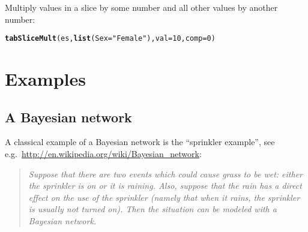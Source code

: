 \documentclass[10pt]{article}\usepackage[]{graphicx}\usepackage[]{xcolor}
\makeatletter
\newcommand{\hlnum}[1]{\textcolor[rgb]{0.686,0.059,0.569}{#1}}%
\newcommand{\hlstr}[1]{\textcolor[rgb]{0.192,0.494,0.8}{#1}}%
\newcommand{\hlstd}[1]{\textcolor[rgb]{0.345,0.345,0.345}{#1}}%
\newcommand{\hlkwc}[1]{\textcolor[rgb]{0.333,0.667,0.333}{#1}}%
\newcommand{\hlkwd}[1]{\textcolor[rgb]{0.737,0.353,0.396}{\textbf{#1}}}%
\newenvironment{kframe}{%
 \def\at@end@of@kframe{}%
 \ifinner\ifhmode%
  \def\at@end@of@kframe{\end{minipage}}%
  \begin{minipage}{\columnwidth}%
 \fi\fi%
 \def\FrameCommand##1{\hskip\@totalleftmargin \hskip-\fboxsep
 \colorbox{shadecolor}{##1}\hskip-\fboxsep
     \hskip-\linewidth \hskip-\@totalleftmargin \hskip\columnwidth}%
 \MakeFramed {\advance\hsize-\width
   \@totalleftmargin\z@ \linewidth\hsize
   \@setminipage}}%
 {\par\unskip\endMakeFramed%
 \at@end@of@kframe}
\newenvironment{knitrout}{}{} %
\def\code#1{\texttt{#1}}
\def\rr#1{\code{#1}[{\scriptsize gRbase}]}
\makeatother
\begin{document}
Multiply values in a slice by some number and all other values by
another number:
\begin{knitrout}\small
{}\color{fgcolor}\begin{kframe}
\begin{alltt}
\hlkwd{tabSliceMult}\hlstd{(es,} \hlkwd{list}\hlstd{(}\hlkwc{Sex}\hlstd{=}\hlstr{"Female"}\hlstd{),} \hlkwc{val}\hlstd{=}\hlnum{10}\hlstd{,} \hlkwc{comp}\hlstd{=}\hlnum{0}\hlstd{)}
\end{alltt}


{\ttfamily\noindent\bfseries{}}\end{kframe}
\end{knitrout}








\section{Examples}
\label{sec:examples}


\subsection{A Bayesian network}
\label{sec:comp-with-arrays}

A classical example of a Bayesian network is the ``sprinkler
example'', see e.g.\
\url{http://en.wikipedia.org/wiki/Bayesian_network}:
\begin{quote}
  \em
  Suppose that there are two events which could cause grass to be wet:
  either the sprinkler is on or it is raining. Also, suppose that the
  rain has a direct effect on the use of the sprinkler (namely that
  when it rains, the sprinkler is usually not turned on). Then the
  situation can be modeled with a Bayesian network.
\end{quote}
\end{document}
